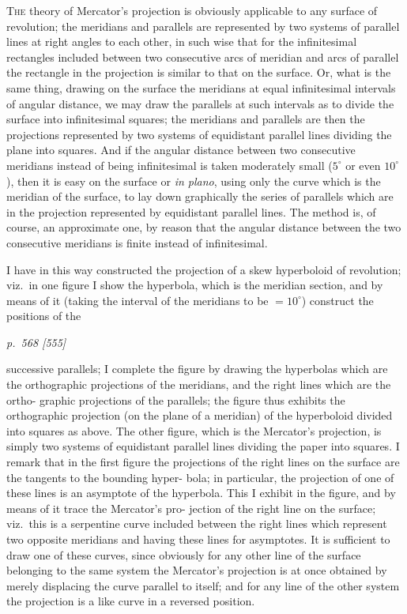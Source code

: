 \documentclass[11pt,a4paper]{article}
\theoremstyle{plain}
\theoremstyle{definition}
\begin{document}
\textsc{The} theory of Mercator's projection is obviously applicable to any surface of
revolution; the meridians and parallels are represented by two systems of parallel lines
at right angles to each other, in such wise that for the infinitesimal rectangles
included between two consecutive arcs of meridian and arcs of parallel the rectangle in
the projection is similar to that on the surface.  Or, what is the same thing, drawing
on the surface the meridians at equal infinitesimal intervals of angular distance, we
may draw the parallels at such intervals as to divide the surface into infinitesimal
squares; the meridians and parallels are then the projections represented by two
systems of equidistant parallel lines dividing the plane into squares.  And if the
angular distance between two consecutive meridians instead of being infinitesimal is
taken moderately small ($5^{\circ}$ or even $10^{\circ}$), then it is easy on the surface or \emph{in plano},
using only the curve which is the meridian of the surface, to lay down graphically
the series of parallels which are in the projection represented by equidistant parallel
lines.  The method is, of course, an approximate one, by reason that the angular distance
between the two consecutive meridians is finite instead of infinitesimal.

\bigskip

I have in this way constructed the projection of a skew hyperboloid of revolution;
viz.\ in one figure I show the hyperbola, which is the meridian section, and by means
of it (taking the interval of the meridians to be $= 10^{\circ}$) construct the positions of the

\clearpage


\noindent
\textit{p.~568 [555]}
\smallskip

\noindent
successive parallels; I complete the figure by drawing the hyperbolas which are the
orthographic projections of the meridians, and the right lines which are the ortho-
graphic projections of the parallels; the figure thus exhibits the orthographic projection
(on the plane of a meridian) of the hyperboloid divided into squares as above.  The
other figure, which is the Mercator's projection, is simply two systems of equidistant
parallel lines dividing the paper into squares.  I remark that in the first figure the
projections of the right lines on the surface are the tangents to the bounding hyper-
bola; in particular, the projection of one of these lines is an asymptote of the
hyperbola.  This I exhibit in the figure, and by means of it trace the Mercator's pro-
jection of the right line on the surface; viz.\ this is a serpentine curve included
between the right lines which represent two opposite meridians and having these lines
for asymptotes.  It is sufficient to draw one of these curves, since obviously for any
other line of the surface belonging to the same system the Mercator's projection is
at once obtained by merely displacing the curve parallel to itself; and for any line of
the other system the projection is a like curve in a reversed position.
\end{document}
